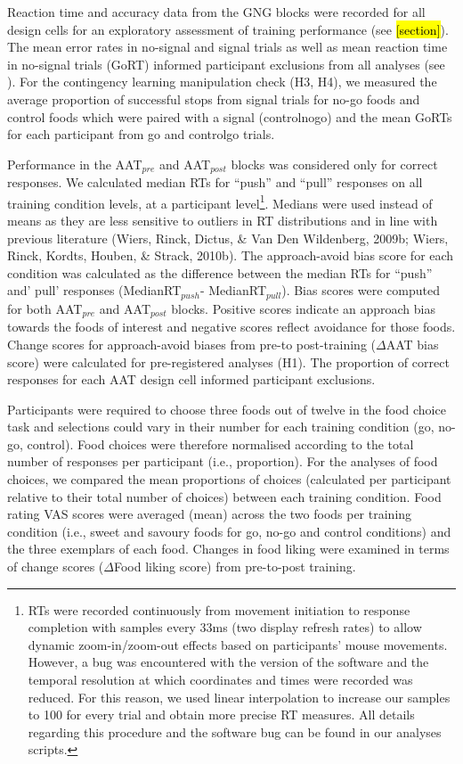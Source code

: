 \documentclass[man,floatsintext]{apa6}
\let\rmarkdownfootnote\footnote%
\def\footnote{\protect\rmarkdownfootnote}
\begin{document}
Reaction time and accuracy data from the GNG blocks were recorded for
all design cells for an exploratory assessment of training performance
(see \hl{[section]}). The mean error rates in no-signal and signal
trials as well as mean reaction time in no-signal trials (GoRT) informed
participant exclusions from all analyses (see
\textit{}). For the contingency learning
manipulation check (H3, H4), we measured the average proportion of
successful stops from signal trials for no-go foods and control foods
which were paired with a signal (controlnogo) and the mean GoRTs for
each participant from go and controlgo trials. \par
Performance in the AAT\(_{pre}\) and AAT\(_{post}\) blocks was
considered only for correct responses. We calculated median RTs for
\enquote{push} and \enquote{pull} responses on all training condition
levels, at a participant
level\footnote{RTs were recorded continuously from movement initiation to response completion with samples every 33ms (two display refresh rates) to allow dynamic zoom-in/zoom-out effects based on participants' mouse movements. However, a bug was encountered with the version of the software and the temporal resolution at which coordinates and times were recorded was reduced. For this reason, we used linear interpolation to increase our samples to 100 for every trial and obtain more precise RT measures. All details regarding this procedure and the software bug can be found in our analyses scripts.}.
Medians were used instead of means as they are less sensitive to
outliers in RT distributions and in line with previous literature
(Wiers, Rinck, Dictus, \& Van Den Wildenberg, 2009b; Wiers, Rinck,
Kordts, Houben, \& Strack, 2010b). The approach-avoid bias score for
each condition was calculated as the difference between the median RTs
for \enquote{push} and' pull' responses (MedianRT\(_{push}\)-
MedianRT\(_{pull}\)). Bias scores were computed for both AAT\(_{pre}\)
and AAT\(_{post}\) blocks. Positive scores indicate an approach bias
towards the foods of interest and negative scores reflect avoidance for
those foods. Change scores for approach-avoid biases from pre-to
post-training (\(\Delta\)AAT bias score) were calculated for
pre-registered analyses (H1). The proportion of correct responses for
each AAT design cell informed participant exclusions. \par
Participants were required to choose three foods out of twelve in the
food choice task and selections could vary in their number for each
training condition (go, no-go, control). Food choices were therefore
normalised according to the total number of responses per participant
(i.e., proportion). For the analyses of food choices, we compared the
mean proportions of choices (calculated per participant relative to
their total number of choices) between each training condition. Food
rating VAS scores were averaged (mean) across the two foods per training
condition (i.e., sweet and savoury foods for go, no-go and control
conditions) and the three exemplars of each food. Changes in food liking
were examined in terms of change scores (\(\Delta\)Food liking score)
from pre-to-post training.
\end{document}
